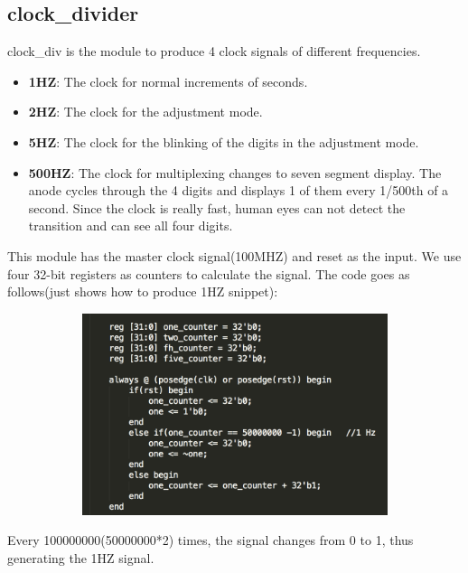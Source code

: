 \documentclass[12pt]{article}
\begin{document}
\subsection*{clock\_divider}
clock\_div is the module to produce 4 clock signals of different frequencies.
\begin{itemize}
\item \textbf{1HZ}: The clock for normal increments of seconds.
\item \textbf{2HZ}: The clock for the adjustment mode.
\item \textbf{5HZ}: The clock for the blinking of the digits in the adjustment mode.
\item \textbf{500HZ}: The clock for multiplexing changes to seven segment display. The anode cycles through the 4 digits and displays 1 of them every 1/500th of a second. Since the clock is really fast, human eyes can not detect the transition and can see all four digits. 
\end{itemize}
This module has the master clock signal(100MHZ) and reset as the input. We use four 32-bit registers as counters to calculate the signal. The code goes as follows(just shows how to produce 1HZ snippet):\\
\begin{minipage}{\linewidth}
            \centering
            \includegraphics[width=14cm, height=5.9cm]{clock.png}
        \end{minipage} 
Every 100000000(50000000*2) times, the signal changes from 0 to 1, thus generating the 1HZ signal.
\end{document}
